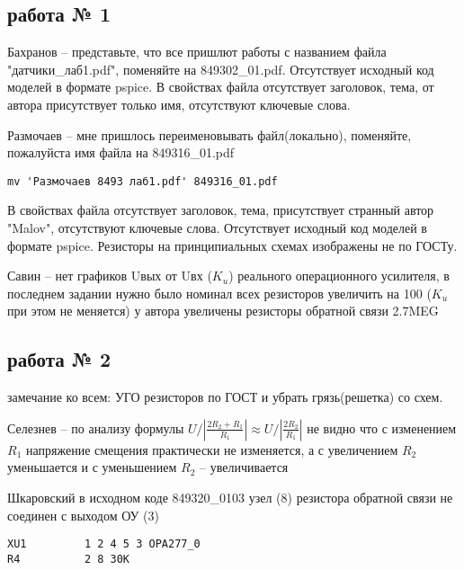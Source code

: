 \documentclass[a4paper,landscape,11pt]{article}
\begin{document}
\subsection{работа № 1}
Бахранов  -- представьте, что все пришлют работы с названием файла "датчики\_лаб1.pdf", поменяйте на  849302\_01.pdf. Отсутствует исходный код моделей в формате pspice.
В свойствах файла отсутствует заголовок, тема, от автора присутствует только имя, отсутствуют ключевые слова.

Размочаев -- мне пришлось переименовывать файл(локально), поменяйте, пожалуйста имя файла на  849316\_01.pdf
\begin{verbatim}
mv 'Размочаев 8493 лаб1.pdf' 849316_01.pdf
\end{verbatim}
В свойствах файла отсутствует заголовок, тема, присутствует странный автор "Malov", отсутствуют ключевые слова. Отсутствует исходный код моделей в формате pspice.
Резисторы на принципиальных схемах изображены не по ГОСТу.

Савин -- нет графиков Uвых от Uвх ($K_u$) реального операционного усилителя, в последнем задании нужно было номинал всех  резисторов увеличить на 100 ($K_u$ при этом не меняется) 
у автора увеличены резисторы обратной связи 2.7MEG 

\subsection{работа № 2}
замечание ко всем: УГО резисторов по ГОСТ и убрать грязь(решетка) со схем.

Селезнев -- по анализу формулы $U/|\frac{2R_2 + R_1}{R_1}| \approx U/|\frac{2R_2}{R_1}|$ не видно что с изменением $R_1$
напряжение смещения практически не изменяется, а с увеличением $R_2$
уменьшается и с уменьшением $R_2$ – увеличивается


Шкаровский в исходном коде 849320\_0103 узел (8) резистора обратной связи не соединен с выходом ОУ (3)
\begin{verbatim}
XU1         1 2 4 5 3 OPA277_0
R4          2 8 30K
\end{verbatim}
\end{document}
